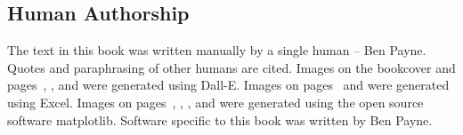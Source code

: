 \begin{center}
\section*{Human Authorship}
\end{center}

The text in this book was written manually by a single human -- Ben Payne. Quotes and paraphrasing of other humans are cited. Images on the bookcover and pages~\pageref{fig:subordinate_and_supervisor}, \pageref{fig:meeting-to-discuss-coordination}, and \pageref{fig:toaster_oven} were generated using Dall-E. Images on pages~\pageref{fig:pareto_frontier_cars} and \pageref{fig:hours_per_year} were generated using Excel. Images on pages~\pageref{fig:task-distribution-tasks-per-person}, \pageref{fig:task-distribution-backlog-length}, \pageref{fig:task-distribution-percent-of-tasks}, and \pageref{fig:task-distribution-completed-vs-size} were generated using the open source software matplotlib. Software specific to this book was written by Ben Payne. 

